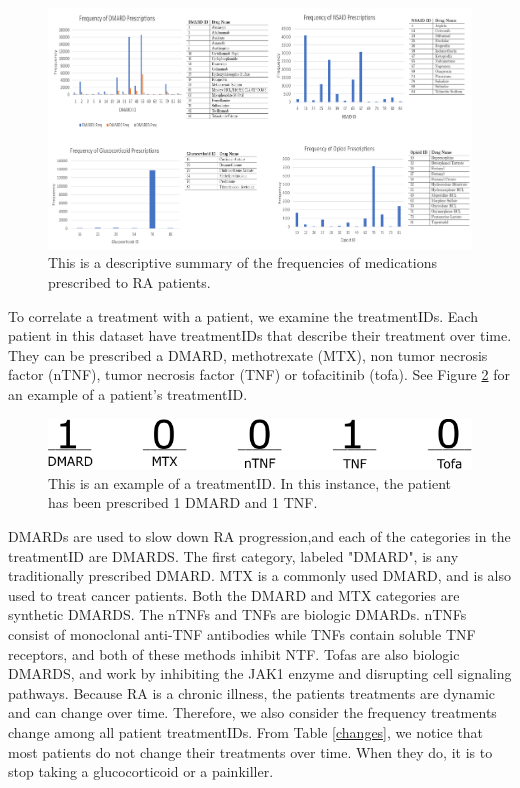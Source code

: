 \documentclass[10pt]{article}
\begin{document}
\begin{figure}[H]
	\centering
	\includegraphics[width=.99\linewidth, scale=1.5]{Figures/TreatmentFrequency}
	\caption{This is a descriptive summary of the frequencies of medications prescribed to RA patients.}
	\label{fig:PrescriptionFrequency}
\end{figure}


To correlate a treatment with a patient, we examine the treatmentIDs. Each patient in this dataset have treatmentIDs that describe their treatment over time. They can be prescribed a DMARD, methotrexate (MTX), non tumor necrosis factor (nTNF), tumor necrosis factor (TNF) or tofacitinib (tofa). See Figure \ref{fig:ID} for an example of a patient's treatmentID.

\begin{figure}[H]
	\centering
	\includegraphics[width=.35\linewidth, scale=0.25]{Figures/TreatmentGroup}
	\caption{This is an example of a treatmentID. In this instance, the patient has been prescribed 1 DMARD and 1 TNF.}
	\label{fig:ID}
\end{figure}
	
DMARDs are used to slow down RA progression,and each of the categories in the treatmentID are DMARDS. The first category, labeled "DMARD", is any traditionally prescribed DMARD. MTX is a commonly used DMARD, and is also used to treat cancer patients. Both the DMARD and MTX categories are synthetic DMARDS. The nTNFs and TNFs are biologic DMARDs. nTNFs consist of monoclonal anti-TNF antibodies while TNFs contain soluble TNF receptors, and both of these methods inhibit NTF. Tofas are also biologic DMARDS, and work by inhibiting the JAK1 enzyme and disrupting cell signaling pathways. Because RA is a chronic illness, the patients treatments are dynamic and can change over time. Therefore, we also consider the frequency treatments change among all patient treatmentIDs. From Table \ref{changes}, we notice that most patients do not change their treatments over time. When they do, it is to stop taking a glucocorticoid or a painkiller.   
\end{document}
